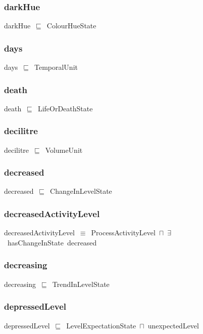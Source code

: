 \documentclass{article}
\begin{document}
\subsubsection*{darkHue}

darkHue~\ensuremath{\sqsubseteq}~ColourHueState~

\subsubsection*{days}

days~\ensuremath{\sqsubseteq}~TemporalUnit~

\subsubsection*{death}

death~\ensuremath{\sqsubseteq}~LifeOrDeathState~

\subsubsection*{decilitre}

decilitre~\ensuremath{\sqsubseteq}~VolumeUnit~

\subsubsection*{decreased}

decreased~\ensuremath{\sqsubseteq}~ChangeInLevelState~

\subsubsection*{decreasedActivityLevel}

decreasedActivityLevel~\ensuremath{\equiv}~ProcessActivityLevel~\ensuremath{\sqcap}~\ensuremath{\exists}~hasChangeInState~decreased

\subsubsection*{decreasing}

decreasing~\ensuremath{\sqsubseteq}~TrendInLevelState~

\subsubsection*{depressedLevel}

depressedLevel~\ensuremath{\sqsubseteq}~LevelExpectationState~\ensuremath{\sqcap}~unexpectedLevel~
\end{document}
